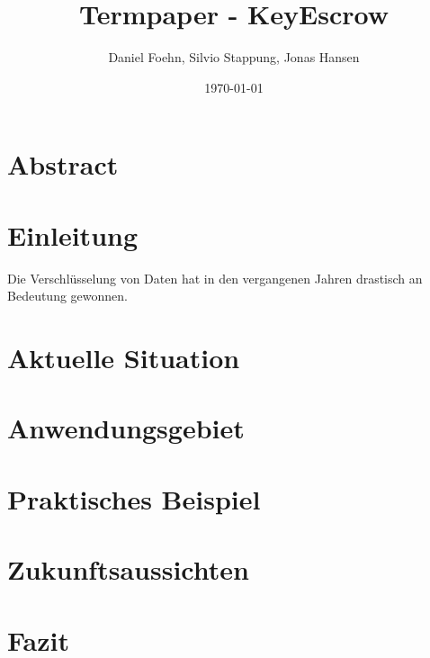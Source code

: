 \documentclass[a4paper, 10pt, fleqn]{article}
\title{Termpaper - KeyEscrow}
\author{Daniel Foehn, Silvio Stappung, Jonas Hansen}
\date{\today} %
\newcommand*{\titleGM}{\begingroup %
\hbox{ %
\hspace*{0.2\textwidth} %
\rule{1pt}{\textheight} %
\hspace*{0.05\textwidth} %
\parbox[b]{0.75\textwidth}{ %

{\noindent\Huge\bfseries Termpaper \\[0.5\baselineskip] Key Escrow}\\[2\baselineskip] %
{\large \textit{HSLU Modul - Network \& Cloud Services}}\\[4\baselineskip] %
{\Large \textsc{Daniel Föhn, Jonas Hansen \\[0.5\baselineskip] und Silvio Stappung}} %

\vspace{0.5\textheight} %
{\noindent \today}\\[\baselineskip] %
}}
\endgroup}
\begin{document}
\begin{titlepage}
	\titleGM
	\thispagestyle{empty}
\end{titlepage}

\tableofcontents
\listoffigures
\clearpage

\section*{Abstract}

\clearpage
\section{Einleitung}
Die Verschlüsselung von Daten hat in den vergangenen Jahren drastisch an Bedeutung gewonnen. 


\clearpage
\section{Aktuelle Situation}
	

\clearpage
\section{Anwendungsgebiet}
	

\clearpage
\section{Praktisches Beispiel}
	 

\clearpage
\section{Zukunftsaussichten}

\clearpage
\section{Fazit}

\nocite{*}
\clearpage


\end{document}
